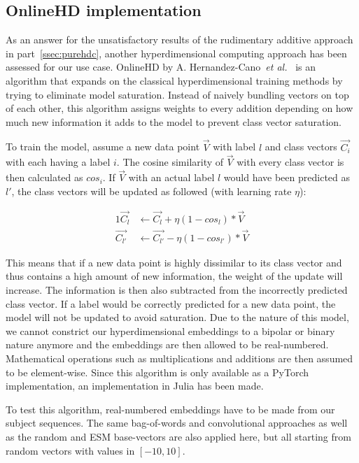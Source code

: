 \subsection*{OnlineHD implementation}
As an answer for the unsatisfactory results of the rudimentary additive approach in part~\ref{ssec:purehdc}, another hyperdimensional computing approach has been assessed for our use case. OnlineHD by A. Hernandez-Cano~\textit{et al.}~\cite{onlinehd} is an algorithm that expands on the classical hyperdimensional training methods by trying to eliminate model saturation. Instead of naively bundling vectors on top of each other, this algorithm assigns weights to every addition  depending on how much new information it adds to the model to prevent class vector saturation.

To train the model, assume a new data point $\vec{V}$ with label $l$ and class vectors $\vec{C_{i}}$ with each having a label $i$. The cosine similarity of $\vec{V}$ with every class vector is then calculated as $cos_{i}$. If $\vec{V}$ with an actual label $l$ would have been predicted as $l'$, the class vectors will be updated as followed (with learning rate $\eta$):

\begin{alignat}{1}
    \label{eqn:onlinehd}
    \vec{C_{l}} &\leftarrow \vec{C_{l}} + \eta (1 - cos_{l}) * \vec{V} \\
    \vec{C_{l'}} &\leftarrow \vec{C_{l'}} - \eta (1 - cos_{l'}) * \vec{V}
\end{alignat}

This means that if a new data point is highly dissimilar to its class vector and thus contains a high amount of new information, the weight of the update will increase. The information is then also subtracted from the incorrectly predicted class vector. If a label would be correctly predicted for a new data point, the model will not be updated to avoid saturation. Due to the nature of this model, we cannot constrict our hyperdimensional embeddings to a bipolar or binary nature anymore and the embeddings are then allowed to be real-numbered. Mathematical operations such as multiplications and additions are then assumed to be element-wise. Since this algorithm is only available as a PyTorch implementation, an implementation in Julia has been made.

To test this algorithm, real-numbered embeddings have to be made from our subject sequences. The same bag-of-words and convolutional approaches as well as the random and ESM base-vectors are also applied here, but all starting from random vectors with values in $[-10, 10]$.